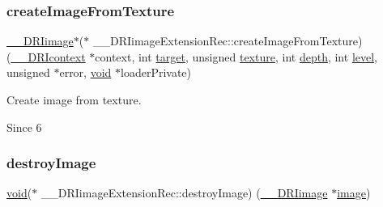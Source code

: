 \mbox{\label{struct_____d_r_iimage_extension_rec_a50e04180f62cbc5892abaca76cfab2ab}} 
\subsubsection{\texorpdfstring{create\+Image\+From\+Texture}{createImageFromTexture}}
{\footnotesize\ttfamily \hyperlink{dri__interface_8h_a37e0407153595dc88fe5d25127645cf1}{\+\_\+\+\_\+\+D\+R\+Iimage}$\ast$($\ast$ \+\_\+\+\_\+\+D\+R\+Iimage\+Extension\+Rec\+::create\+Image\+From\+Texture) (\hyperlink{dri__interface_8h_a3fd295cba82b5a3d79f1ee7e12bfb908}{\+\_\+\+\_\+\+D\+R\+Icontext} $\ast$context, int \hyperlink{glcorearb_8h_af9d0cbbbeb7414e786c41899e5a856d7}{target}, unsigned \hyperlink{glcorearb_8h_a8f486379aef534669f4f06f515e7ce6c}{texture}, int \hyperlink{gl_8h_aa8bd8cf1eef34712fdb6ad58b540a2ee}{depth}, int \hyperlink{gl_8h_a2b536fca24f51d6a849aed325793e661}{level}, unsigned $\ast$error, \hyperlink{_s_d_l__opengles2__gl2ext_8h_ae5d8fa23ad07c48bb609509eae494c95}{void} $\ast$loader\+Private)}

Create image from texture.

\begin{DoxySince}{Since}
6 
\end{DoxySince}
\mbox{\label{struct_____d_r_iimage_extension_rec_ac97ca702de4f8bf00393ebe2c5ccbc5b}} 
\subsubsection{\texorpdfstring{destroy\+Image}{destroyImage}}
{\footnotesize\ttfamily \hyperlink{_s_d_l__opengles2__gl2ext_8h_ae5d8fa23ad07c48bb609509eae494c95}{void}($\ast$ \+\_\+\+\_\+\+D\+R\+Iimage\+Extension\+Rec\+::destroy\+Image) (\hyperlink{dri__interface_8h_a37e0407153595dc88fe5d25127645cf1}{\+\_\+\+\_\+\+D\+R\+Iimage} $\ast$\hyperlink{gl_8h_a0a221b005894579fea3b9eb7bfc2ee71}{image})}

